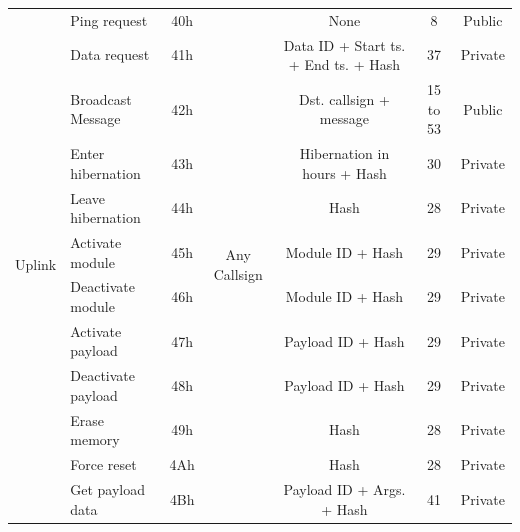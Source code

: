 \begin{landscape}
\begin{table}[ht]
\begin{tabular}{llccccc}
            \midrule
            \multirow{14}{*}{Uplink}  & Ping request          & 40h & \multirow{14}{*}{Any Callsign}      & None                                           & 8                     & Public \\
                                      & Data request          & 41h &                                     & Data ID + Start ts. + End ts. + Hash           & 37                    & Private \\
                                      & Broadcast Message     & 42h &                                     & Dst. callsign + message                        & 15 to 53              & Public \\
                                      & Enter hibernation     & 43h &                                     & Hibernation in hours + Hash                    & 30                    & Private \\
                                      & Leave hibernation     & 44h &                                     & Hash                                           & 28                    & Private \\
                                      & Activate module       & 45h &                                     & Module ID + Hash                               & 29                    & Private \\
                                      & Deactivate module     & 46h &                                     & Module ID + Hash                               & 29                    & Private \\
                                      & Activate payload      & 47h &                                     & Payload ID + Hash                              & 29                    & Private \\
                                      & Deactivate payload    & 48h &                                     & Payload ID + Hash                              & 29                    & Private \\
                                      & Erase memory          & 49h &                                     & Hash                                           & 28                    & Private \\
                                      & Force reset           & 4Ah &                                     & Hash                                           & 28                    & Private \\
                                      & Get payload data      & 4Bh &                                     & Payload ID + Args. + Hash                      & 41                    & Private \\

\end{tabular}
\end{table}
\end{landscape}
